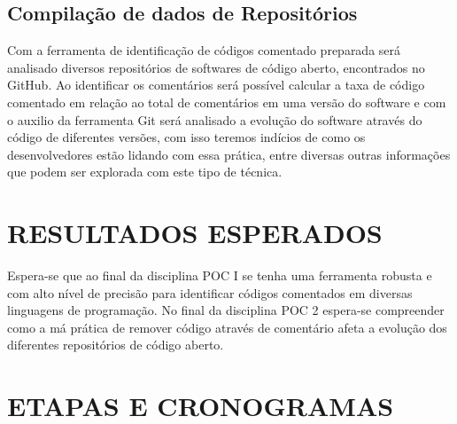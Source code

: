 \documentclass{abnt}
\begin{document}
\section{Compilação de dados de Repositórios}

Com a ferramenta de identificação de códigos comentado preparada será analisado 
diversos repositórios de softwares de código aberto, encontrados
no GitHub. Ao identificar os comentários será possível calcular a taxa de 
código comentado em relação ao total de comentários em uma versão do 
software e com o auxilio da ferramenta Git será analisado a evolução do 
software através do código de diferentes versões, com isso teremos 
indícios de como os desenvolvedores estão lidando com essa prática, entre 
diversas outras informações que podem ser explorada com este tipo
de técnica.

\chapter{RESULTADOS ESPERADOS}

Espera-se que ao final da disciplina POC I se tenha uma ferramenta robusta e
com alto nível de precisão para identificar códigos comentados em diversas
linguagens de programação. No final da disciplina POC 2
espera-se compreender como a má prática de remover código através de 
comentário afeta a evolução dos diferentes repositórios de código aberto.

\chapter{ETAPAS E CRONOGRAMAS}


\end{document}
